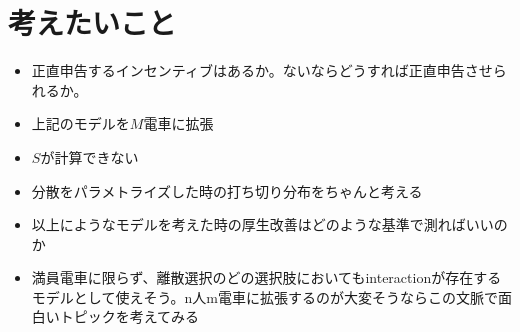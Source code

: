 \documentclass{jsarticle}
\begin{document}
\section{考えたいこと}
\begin{itemize}
	\item 正直申告するインセンティブはあるか。ないならどうすれば正直申告させられるか。
	\item 上記のモデルを$M$電車に拡張
	\item $S$が計算できない
	\item 分散をパラメトライズした時の打ち切り分布をちゃんと考える
	\item 以上にようなモデルを考えた時の厚生改善はどのような基準で測ればいいのか
	\item 満員電車に限らず、離散選択のどの選択肢においてもinteractionが存在するモデルとして使えそう。n人m電車に拡張するのが大変そうならこの文脈で面白いトピックを考えてみる
\end{itemize}
\end{document}
